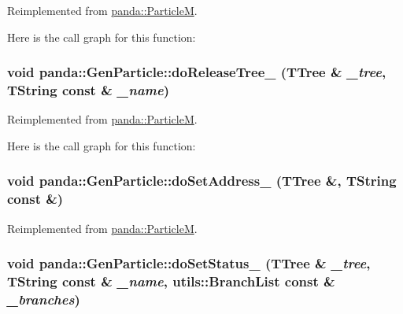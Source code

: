 Reimplemented from \hyperlink{classpanda_1_1ParticleM_ae912914e3970c1fb238589f0ccc783f4}{panda::ParticleM}.

Here is the call graph for this function:\hypertarget{classpanda_1_1GenParticle_a7e328cf82b58dcdf43f008066e42e451}{
\subsubsection[{doReleaseTree\_\-}]{\setlength{\rightskip}{0pt plus 5cm}void panda::GenParticle::doReleaseTree\_\- (TTree \& {\em \_\-tree}, \/  TString const \& {\em \_\-name})}}
\label{classpanda_1_1GenParticle_a7e328cf82b58dcdf43f008066e42e451}


Reimplemented from \hyperlink{classpanda_1_1ParticleM_a0c24df56cbd50a8223fc4d8bf0b776d0}{panda::ParticleM}.

Here is the call graph for this function:\hypertarget{classpanda_1_1GenParticle_a05d969dcffe56d821bb1b73bdb084d6c}{
\subsubsection[{doSetAddress\_\-}]{\setlength{\rightskip}{0pt plus 5cm}void panda::GenParticle::doSetAddress\_\- (TTree \&, \/  TString const \&)}}
\label{classpanda_1_1GenParticle_a05d969dcffe56d821bb1b73bdb084d6c}


Reimplemented from \hyperlink{classpanda_1_1ParticleM_ab54d46a237f8d12074ee36c48af33b04}{panda::ParticleM}.\hypertarget{classpanda_1_1GenParticle_a41d0169feced73ebddb43bf9547cecdf}{
\subsubsection[{doSetStatus\_\-}]{\setlength{\rightskip}{0pt plus 5cm}void panda::GenParticle::doSetStatus\_\- (TTree \& {\em \_\-tree}, \/  TString const \& {\em \_\-name}, \/  {\bf utils::BranchList} const \& {\em \_\-branches})}}
\label{classpanda_1_1GenParticle_a41d0169feced73ebddb43bf9547cecdf}


